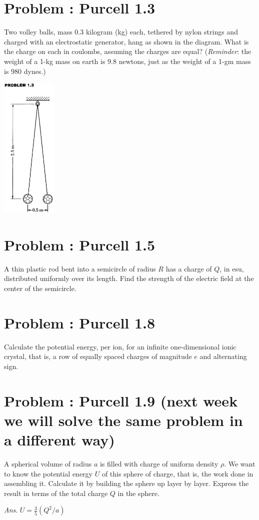 \documentclass[problems]{esg8022pset}
\date{\today }
\begin{document}
\section{Problem \thesection: Purcell 1.3}
  Two volley balls, mass 0.3 kilogram (kg) each, tethered by nylon strings and charged with an electrostatic generator, hang as shown in the diagram. What is the charge on each in coulombs, assuming the charges are equal? (\emph{Reminder}: the weight of a 1-kg mass on earth is 9.8 newtons, just as the weight of a 1-gm mass is 980 dynes.)
  \begin{center}\includegraphics[width=0.2\textwidth]{ps01_1}\end{center}
\section{Problem \thesection: Purcell 1.5}
  A thin plastic rod bent into a semicircle of radius $R$ has a charge of $Q$, in esu, distributed uniformly over its length. Find the strength of the electric field at the center of the semicircle.
\section{Problem \thesection: Purcell 1.8}
  Calculate the potential energy, per ion, for an infinite one-dimensional ionic crystal, that is, a row of equally spaced charges of magnitude $e$ and alternating sign.

  \noindent [\emph{Hint}: The power series expansion of $\ln(1+x)$,
  $$\ln(1+x) = \sum_{j=1}^\infty \frac{(-x)^{j-1}}{j},$$
  may be of use.]
\section{Problem \thesection: Purcell 1.9 (next week we will solve the same problem in a different way)}
  A spherical volume of radius $a$ is filled with charge of uniform density $\rho$. We want to know the potential energy $U$ of this sphere of charge, that is, the work done in assembling it. Calculate it by building the sphere up layer by layer.  Express the result in terms of the total charge $Q$ in the sphere.
  \begin{flushright}\emph{Ans}. $U = \frac35 (Q^2 / a)$\end{flushright}
\end{document}
